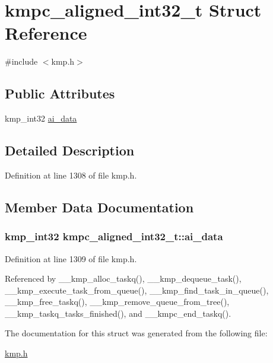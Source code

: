 \hypertarget{structkmpc__aligned__int32__t}{\section{kmpc\-\_\-aligned\-\_\-int32\-\_\-t Struct Reference}
\label{structkmpc__aligned__int32__t}
}


{\ttfamily \#include $<$kmp.\-h$>$}

\subsection*{Public Attributes}
\begin{DoxyCompactItemize}
\item 
kmp\-\_\-int32 \hyperlink{structkmpc__aligned__int32__t_a7efe129c534cb7eed099a06549c81cfe}{ai\-\_\-data}
\end{DoxyCompactItemize}


\subsection{Detailed Description}


Definition at line 1308 of file kmp.\-h.



\subsection{Member Data Documentation}
\hypertarget{structkmpc__aligned__int32__t_a7efe129c534cb7eed099a06549c81cfe}{
\subsubsection[{ai\-\_\-data}]{\setlength{\rightskip}{0pt plus 5cm}kmp\-\_\-int32 kmpc\-\_\-aligned\-\_\-int32\-\_\-t\-::ai\-\_\-data}}\label{structkmpc__aligned__int32__t_a7efe129c534cb7eed099a06549c81cfe}


Definition at line 1309 of file kmp.\-h.



Referenced by \-\_\-\-\_\-kmp\-\_\-alloc\-\_\-taskq(), \-\_\-\-\_\-kmp\-\_\-dequeue\-\_\-task(), \-\_\-\-\_\-kmp\-\_\-execute\-\_\-task\-\_\-from\-\_\-queue(), \-\_\-\-\_\-kmp\-\_\-find\-\_\-task\-\_\-in\-\_\-queue(), \-\_\-\-\_\-kmp\-\_\-free\-\_\-taskq(), \-\_\-\-\_\-kmp\-\_\-remove\-\_\-queue\-\_\-from\-\_\-tree(), \-\_\-\-\_\-kmp\-\_\-taskq\-\_\-tasks\-\_\-finished(), and \-\_\-\-\_\-kmpc\-\_\-end\-\_\-taskq().



The documentation for this struct was generated from the following file\-:\begin{DoxyCompactItemize}
\item 
\hyperlink{kmp_8h}{kmp.\-h}\end{DoxyCompactItemize}
